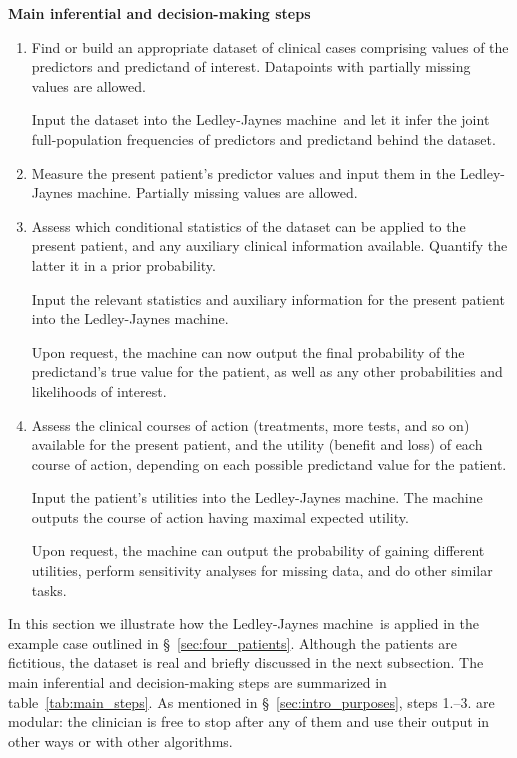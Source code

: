 \documentclass[utf8]{FrontiersinHarvard} %
\newcommand*{\sect}{\S}%
\renewcommand*{\|}[1][]{\nonscript\:#1\vert\nonscript\:\mathopen{}}
\newcommand*{\ljm}{Ledley-Jaynes machine}
\begin{document}
\begin{table}[b]  
  \begin{framed}
    \small
      \caption{\bf Main inferential and decision-making steps}\label{tab:main_steps}
      \begin{enumerate}\itemsep1em
        \setcounter{enumi}{-1}
    \item\label{item:learn} Find or build an appropriate dataset of clinical cases comprising values of the predictors and predictand of interest. Datapoints with partially missing values are allowed.

      Input the dataset into the \ljm\ and let it infer the joint full-population frequencies of predictors and predictand behind the dataset.

    \item\label{item:predictors} Measure the present patient's predictor values and input them in the \ljm. Partially missing values are allowed.

    \item\label{item:population} Assess which conditional statistics of the dataset can be applied to the present patient, and any auxiliary clinical information available. Quantify the latter it in a prior probability.

      Input the relevant statistics and auxiliary information for the present patient into the \ljm. 

      Upon request, the machine can now output the final probability of the predictand's true value for the patient, as well as any other probabilities and likelihoods of interest.
      
    \item\label{item:utilities} Assess the clinical courses of action (treatments, more tests, and so on) available for the present patient, and the utility (benefit and loss) of each course of action, depending on each possible predictand value for the patient.

      Input the patient's utilities into the \ljm. The machine outputs the course of action having maximal expected utility.

      Upon request, the machine can output the probability of gaining different utilities, perform sensitivity analyses for missing data, and do other similar tasks.
    \end{enumerate}
  \end{framed}
\end{table}

In this section we illustrate how the \ljm\ is applied in the example case outlined in \sect~\ref{sec:four_patients}. Although the patients are fictitious, the dataset is real and briefly discussed in the next subsection. The main inferential and decision-making steps are summarized in table~\ref{tab:main_steps}. As mentioned in \sect~\ref{sec:intro_purposes}, steps 1.--3. are modular: the clinician is free to stop after any of them and use their output in other ways or with other algorithms.
\end{document}
